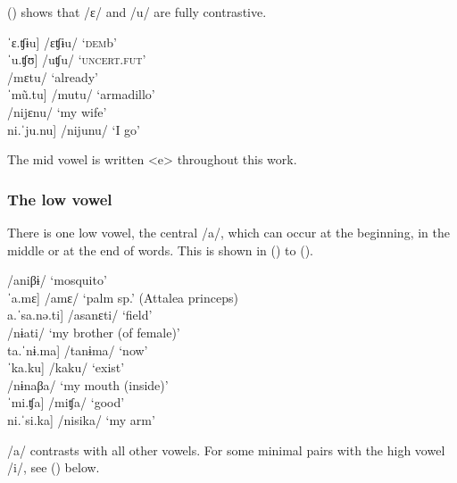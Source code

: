 () shows that /ɛ/ and /u/ are fully contrastive.  
    
\ea\label{ex:e-u}
\ea 	\tab{[}ˈɛ.ʧɨu] \tab /ɛʧɨu/ \tab\tab ‘\textsc{dem}b’\\
 	\tab{[}ˈu.ʧʊ] \tab /uʧu/ \tab\tab ‘\textsc{uncert.fut}’\\
\ex 	\tab[ˈmɛ.tu] \tab /mɛtu/ \tab ‘already’\\
 	\tab{[}ˈmũ.tu] \tab /mutu/ \tab ‘armadillo’\\
\ex   \tab[ni.ˈjɛ.nu] \tab /nijɛnu/ \tab ‘my wife’\\
 	\tab{[}ni.ˈju.nu] \tab /nijunu/ \tab ‘I go’\\%
\z
\xe
	
The mid vowel is written <e> throughout this work.

\subsubsection{The low vowel} \label{paragraph:LowVowel}

There is one low vowel, the central /a/, which can occur at the beginning, in the middle or at the end of words. This is shown  in () to ().

\ea\label{ex:a}
\ea\label{ex:a.1}     \tab[a.ˈni.βɨ] \tab /aniβɨ/ \tab ‘mosquito’\\
     \tab{[}ˈa.mɛ] \tab /amɛ/ \tab\tab ‘palm sp.’ (Attalea princeps)\\
     \tab{[}a.ˈsa.nǝ.ti] \tab /asanɛti/ \tab ‘field’\\
\ex\label{ex:a.2}    \tab[ˈnɨa.ti] \tab /nɨati/ \tab ‘my brother (of female)’\\
     \tab{[}ta.ˈnɨ.ma] \tab /tanɨma/ \tab ‘now’\\
    \tab{[}ˈka.ku] \tab /kaku/ \tab ‘exist’\\
\ex\label{ex:a.3}      \tab[nɨ.ˈna.βa] \tab /nɨnaβa/ \tab ‘my mouth (inside)’\\
     \tab{[}ˈmi.ʧa] \tab /miʧa/ \tab ‘good’\\
     \tab{[}ni.ˈsi.ka] \tab /nisika/ \tab ‘my arm’\\%
\z
\xe

/a/ contrasts with all other vowels. For some minimal pairs with the high vowel /i/,  see () below. 

